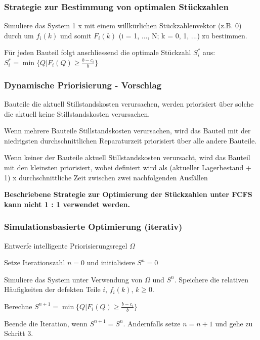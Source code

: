 \subsubsection{Strategie zur Bestimmung von optimalen Stückzahlen}
\begin{compactenum}
	\item Simuliere das System 1 x mit einem willkürlichen Stückzahlenvektor (z.B. 0) durch um $f_i(k)$ und somit $F_i(k)$ (i = 1, ..., N; k = 0, 1, ...) zu bestimmen.
	\item Für jeden Bauteil folgt anschliessend die optimale Stückzahl $S_i^*$ aus:	$S_i^* = \min \{Q|F_i(Q) \geq\frac{b-c_i}{b}\}$
\end{compactenum}

\subsubsection{Dynamische Priorisierung - Vorschlag}
\begin{compactenum}
	\item Bauteile die aktuell Stillstandskosten verursachen, werden priorisiert über solche die aktuell keine Stillstandskosten verursachen.
	\item Wenn mehrere Bauteile Stillstandskosten verursachen, wird das Bauteil mit der niedrigsten durchschnittlichen Reparaturzeit priorisiert über alle andere Bauteile.
	\item Wenn keiner der Bauteile aktuell Stillstandskosten verursacht, wird das Bauteil mit den kleinsten  priorisiert, wobei  definiert wird als (aktueller Lagerbestand + 1) x durchschnittliche Zeit zwischen zwei nachfolgenden Ausfällen
\end{compactenum}
\textbf{Beschriebene Strategie zur Optimierung der Stückzahlen unter FCFS kann nicht 1 : 1 verwendet werden.}

\subsubsection{Simulationsbasierte Optimierung (iterativ)}
\begin{compactenum}
	\item Entwerfe intelligente Priorisierungsregel $\Omega$
	\item Setze Iterationszahl $n = 0$ und initialisiere $S^n = 0$
	\item  Simuliere das System unter Verwendung von $\Omega$ und $S^n$. Speichere die relativen Häufigkeiten der defekten Teile $i$, $f_i(k)$, $k \geq 0$.
	\item Berechne $S^{n+1} = \min \{Q|F_i(Q) \geq\frac{b-c_i}{b}\}$
	\item Beende die Iteration, wenn $S^{n+1} = S^n$. Andernfalls setze $n = n + 1$ und gehe zu Schritt 3.
\end{compactenum}
